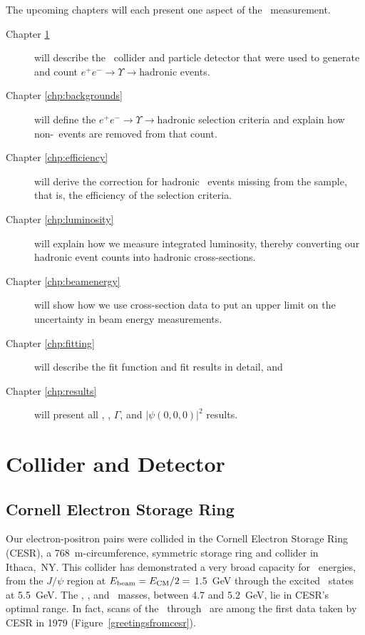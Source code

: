\documentclass{cornell}
\begin{document}
The upcoming chapters will each present one aspect of the \geehadtot\
measurement.
\begin{description}

  \item[Chapter \ref{chp:hardware}] will describe the \ee\ collider
    and particle detector that were used to generate and count $e^+e^-
    \to \Upsilon \to \mbox{hadronic}$ events.

  \item[Chapter \ref{chp:backgrounds}] will define the $e^+e^- \to
    \Upsilon \to \mbox{hadronic}$ selection criteria and explain how
    non-\ups\ events are removed from that count.

  \item[Chapter \ref{chp:efficiency}] will derive the correction
    for hadronic \ups\ events missing from the sample, that is, the
    efficiency of the selection criteria.

  \item[Chapter \ref{chp:luminosity}] will explain how we measure
    integrated luminosity, thereby converting our hadronic event
    counts into hadronic cross-sections.

  \item[Chapter \ref{chp:beamenergy}] will show how we use
    cross-section data to put an upper limit on the uncertainty in
    beam energy measurements.

  \item[Chapter \ref{chp:fitting}] will describe the fit function and
    fit results in detail, and

  \item[Chapter \ref{chp:results}] will present all \geehadtot, \gee,
  $\Gamma$, and $|\psi(0,0,0)|^2$ results.

\end{description}

\chapter{Collider and Detector}
\label{chp:hardware}

\section{Cornell Electron Storage Ring}

Our electron-positron pairs were collided in the Cornell Electron
Storage Ring (CESR), a 768~m-circumference, symmetric storage ring
and collider in Ithaca,~NY.  This collider has demonstrated a very
broad capacity for \ee\ energies, from the $J/\psi$ region at
$E_{\mbox{\scriptsize beam}} = E_{\mbox{\scriptsize CM}}/2 =$ 1.5~GeV through the excited \ups\
states at 5.5~GeV.  The \us, \uss, and \usss\ masses, between 4.7 and
5.2~GeV, lie in CESR's optimal range.  In fact, scans of the \us\
through \usss\ are among the first data taken by CESR in 1979
(Figure~\ref{greetingsfromcesr}).
\end{document}
